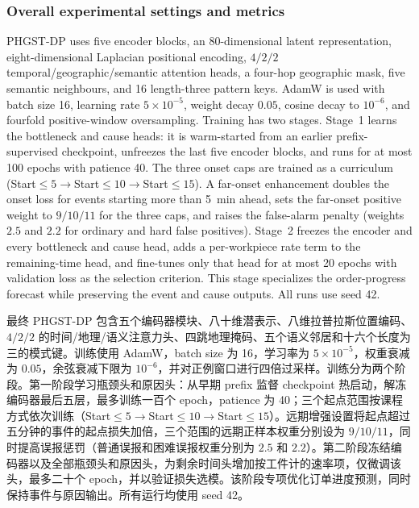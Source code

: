 \documentclass[a4paper,fleqn]{cas-dc}
\newcommand{\zhpara}[1]{%
  \par\begingroup\small\color{black!72}\noindent #1\par\endgroup}
\begin{document}
\subsubsection{Overall experimental settings and metrics}

PHGST-DP uses five encoder blocks, an 80-dimensional latent representation, eight-dimensional Laplacian positional encoding, $4/2/2$ temporal/geographic/semantic attention heads, a four-hop geographic mask, five semantic neighbours, and 16 length-three pattern keys. AdamW is used with batch size 16, learning rate $5\times10^{-5}$, weight decay $0.05$, cosine decay to $10^{-6}$, and fourfold positive-window oversampling. Training has two stages. Stage~1 learns the bottleneck and cause heads: it is warm-started from an earlier prefix-supervised checkpoint, unfreezes the last five encoder blocks, and runs for at most 100 epochs with patience 40. The three onset caps are trained as a curriculum (Start$\leq5\rightarrow$Start$\leq10\rightarrow$Start$\leq15$). A far-onset enhancement doubles the onset loss for events starting more than 5~min ahead, sets the far-onset positive weight to $9/10/11$ for the three caps, and raises the false-alarm penalty (weights $2.5$ and $2.2$ for ordinary and hard false positives). Stage~2 freezes the encoder and every bottleneck and cause head, adds a per-workpiece rate term to the remaining-time head, and fine-tunes only that head for at most 20 epochs with validation loss as the selection criterion. This stage specializes the order-progress forecast while preserving the event and cause outputs. All runs use seed 42.

\zhpara{最终 PHGST-DP 包含五个编码器模块、八十维潜表示、八维拉普拉斯位置编码、$4/2/2$ 的时间/地理/语义注意力头、四跳地理掩码、五个语义邻居和十六个长度为三的模式键。训练使用 AdamW，batch size 为 16，学习率为 $5\times10^{-5}$，权重衰减为 $0.05$，余弦衰减下限为 $10^{-6}$，并对正例窗口进行四倍过采样。训练分为两个阶段。第一阶段学习瓶颈头和原因头：从早期 prefix 监督 checkpoint 热启动，解冻编码器最后五层，最多训练一百个 epoch，patience 为 40；三个起点范围按课程方式依次训练（Start$\leq5\rightarrow$Start$\leq10\rightarrow$Start$\leq15$）。远期增强设置将起点超过五分钟的事件的起点损失加倍，三个范围的远期正样本权重分别设为 $9/10/11$，同时提高误报惩罚（普通误报和困难误报权重分别为 $2.5$ 和 $2.2$）。第二阶段冻结编码器以及全部瓶颈头和原因头，为剩余时间头增加按工件计的速率项，仅微调该头，最多二十个 epoch，并以验证损失选模。该阶段专项优化订单进度预测，同时保持事件与原因输出。所有运行均使用 seed 42。}
\end{document}
